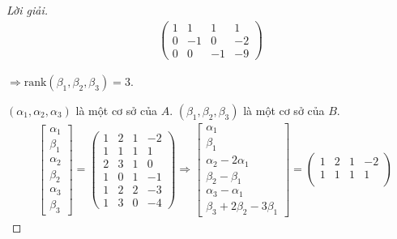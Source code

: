 \documentclass[class=linear-algebra,crop=false]{standalone}
\begin{document}
\begin{proof}[Lời giải]
\begin{align*}
        \begin{pmatrix}
            1 & 1  & 1  & 1  \\
            0 & -1 & 0  & -2 \\
            0 & 0  & -1 & -9
        \end{pmatrix}
    \end{align*}
    \par $\Rightarrow\text{rank}(\beta_{1}, \beta_{2}, \beta_{3}) = 3$.
    \par $(\alpha_{1}, \alpha_{2}, \alpha_{3})$ là một cơ sở của $A$. $(\beta_{1}, \beta_{2}, \beta_{3})$ là một cơ sở của $B$.
    \begin{align*}
                        & \begin{bmatrix}
                              \alpha_{1} \\
                              \beta_{1}  \\
                              \alpha_{2} \\
                              \beta_{2}  \\
                              \alpha_{3} \\
                              \beta_{3}
                          \end{bmatrix}=
        \begin{pmatrix}
            1 & 2 & 1 & -2 \\
            1 & 1 & 1 & 1  \\
            2 & 3 & 1 & 0  \\
            1 & 0 & 1 & -1 \\
            1 & 2 & 2 & -3 \\
            1 & 3 & 0 & -4
        \end{pmatrix}
        \Longrightarrow
        \begin{bmatrix}
            \alpha_{1}               \\
            \beta_{1}                \\
            \alpha_{2} - 2\alpha_{1} \\
            \beta_{2} - \beta_{1}    \\
            \alpha_{3} - \alpha_{1}  \\
            \beta_{3} + 2\beta_{2} - 3\beta_{1}
        \end{bmatrix}=
        \begin{pmatrix}
            1 & 2  & 1  & -2 \\
            1 & 1  & 1  & 1  \\

\end{pmatrix}
\end{align*}
\end{proof}
\end{document}
